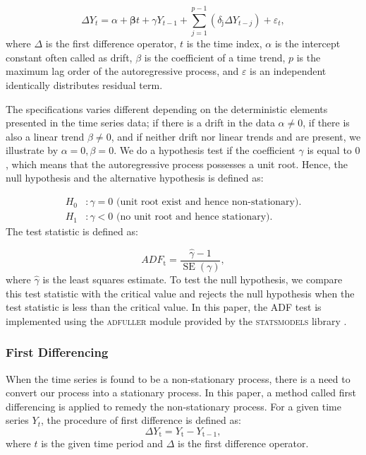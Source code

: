 \begin{equation}\label{eq:AR}
    \Delta Y_{t}=\alpha+\boldsymbol{\beta} t+\gamma Y_{t-1}+\sum_{j=1}^{p-1}\left(\delta_{\mathrm{j}} \Delta Y_{t-j}\right)+\varepsilon_{t} ,
\end{equation}
where $\Delta$ is the first difference operator, $t$ is the time index, $\alpha$ is the intercept constant often called as drift, $\beta$ is the coefficient of a time trend, $p$ is the maximum lag order of the autoregressive process, and $\varepsilon$ is an independent identically distributes residual term.

The specifications varies different depending on the deterministic elements presented in the time series data; if there is a drift in the data $\alpha\neq0$, if there is also a linear trend $\beta\neq0$, and if neither drift nor linear trends and are present, we illustrate by $\alpha = 0, \beta = 0$. We do a hypothesis test if the coefficient $\gamma$ is equal to $0$, which means that the autoregressive process possesses a unit root. Hence, the null hypothesis and the alternative hypothesis is defined as:

\begin{align}\label{eq:ADF_hypothesis}
    H_{0}&: \gamma = 0 \mbox{ (unit root exist and hence non-stationary)}.\\
    H_{1}&: \gamma < 0 \mbox{ (no unit root and hence stationary)}.
\end{align}
The test statistic is defined as:

\begin{equation}\label{eq:ADFt}
    ADF_{\mathrm{t}}=\frac{\hat{\gamma}-1}{\operatorname{SE}(\gamma)} , 
\end{equation}
where $\hat{\gamma}$ is the least squares estimate. To test the null hypothesis, we compare this test statistic with the critical value and rejects the null hypothesis when the test statistic is less than the critical value. In this paper, the ADF test is implemented using the \textsc{adfuller} module provided by the \textsc{statsmodels} library \citep{statsmodels_ADF}. 

\subsubsection{First Differencing}
When the time series is found to be a non-stationary process, there is a need to convert our process into a stationary process. In this paper, a method called first differencing is applied to remedy the non-stationary process. For a given time series $Y_{t}$, the procedure of first difference is defined as:
\begin{equation}\label{eq:First_Difference}
    \Delta Y_{\mathrm{t}} = Y_{\mathrm{t}} - Y_{\mathrm{t-1}},
\end{equation}
where $t$ is the given time period and $\Delta$ is the first difference operator. 

